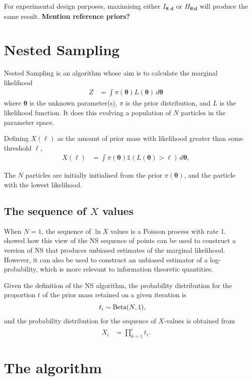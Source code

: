 \documentclass[entropy,article,accept,oneauthor,pdftex,10pt,a4paper]{mdpi}
\renewcommand{\d}{\boldsymbol{d}}
\newcommand{\todo}{\color{orange} \bf}
\newcommand{\x}{\boldsymbol{\theta}}
\begin{document}
For experimental design purposes, maximising either $I_{\x, \d}$ or
$H_{\x | \d}$ will produce the same result. {\todo Mention reference priors?}


\section{Nested Sampling}

Nested Sampling \citep[NS][]{skilling2006nested} is an algorithm whose aim is
to calculate the marginal likelihood
\begin{align}
Z &= \int \pi(\x) L(\x) \, d\x
\end{align}
where $\x$ is the unknown parameter(s), $\pi$ is the prior distribution,
and $L$ is the likelihood function. It does this evolving a population of
$N$ particles in the parameter space.

Defining $X(\ell)$ as the amount of prior mass with likelihood greater than
some threshold $\ell$,
\begin{align}
X(\ell) &= \int \pi(\x) \mathds{1}\left(L(\x) > \ell\right) \, d\x,
\end{align} 

The $N$ particles are initially initialised from the prior $\pi(\x)$, and the
particle with the lowest likelihood.

\subsection{The sequence of $X$ values}

When $N=1$, the sequence of $\ln X$ values is a Poisson process with rate
1. \citet{Walter2015} showed how this view of the NS sequence of points
can be used to construct a
version of NS that produces unbiased estimates of the marginal likelihood.
However, it can also be used to construct an unbiased estimator of
a log-probability, which is more relevant to information theoretic
quantities.

Given the definition of the NS algorithm,
the probability distribution for the proportion $t$ of the prior mass
retained on a given iteration is
\begin{align}
t_i &\sim \textnormal{Beta}(N, 1),
\end{align}
and the probability distribution for the sequence of $X$-values is
obtained from
\begin{align}
X_i &= \prod_{k=1}^i t_i.
\end{align}

\section{The algorithm}
\end{document}
